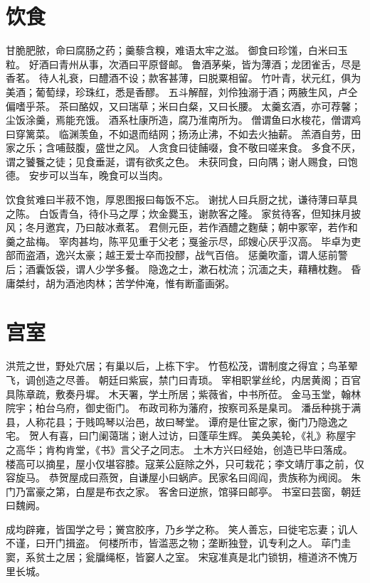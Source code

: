 \documentclass[12pt,UTF8]{ctexbook}
\begin{document}
\chapter{饮食}

甘脆肥脓，命曰腐肠之药；羹藜含糗，难语太牢之滋。
御食曰珍馐，白米曰玉粒。
好酒曰青州从事，次酒曰平原督邮。
鲁酒茅柴，皆为薄酒；龙团雀舌，尽是香茗。
待人礼衰，曰醴酒不设；款客甚薄，曰脱粟相留。
竹叶青，状元红，俱为美酒；葡萄绿，珍珠红，悉是香醪。
五斗解酲，刘伶独溺于酒；两腋生风，卢仝偏嗜乎茶。
茶曰酪奴，又曰瑞草；米曰白粲，又曰长腰。
太羹玄酒，亦可荐馨；尘饭涂羹，焉能充饿。
酒系杜康所造，腐乃淮南所为。
僧谓鱼曰水梭花，僧谓鸡曰穿篱菜。
临渊羡鱼，不如退而结网；扬汤止沸，不如去火抽薪。
羔酒自劳，田家之乐；含哺鼓腹，盛世之风。
人贪食曰徒餔啜，食不敬曰嗟来食。
多食不厌，谓之饕餮之徒；见食垂涎，谓有欲炙之色。
未获同食，曰向隅；谢人赐食，曰饱德。
安步可以当车，晚食可以当肉。

饮食贫难曰半菽不饱，厚恩图报曰每饭不忘。
谢扰人曰兵厨之扰，谦待薄曰草具之陈。
白饭青刍，待仆马之厚；炊金爨玉，谢款客之隆。
家贫待客，但知抹月披风；冬月邀宾，乃曰敲冰煮茗。
君侧元臣，若作酒醴之麴蘖；朝中冢宰，若作和羹之盐梅。
宰肉甚均，陈平见重于父老；戛釜示尽，邱嫂心厌乎汉高。
毕卓为吏部而盗酒，逸兴太豪；越王爱士卒而投醪，战气百倍。
惩羹吹齑，谓人惩前警后；酒囊饭袋，谓人少学多餐。
隐逸之士，漱石枕流；沉湎之夫，藉糟枕麴。
昏庸桀纣，胡为酒池肉林；苦学仲淹，惟有断齑画粥。

\chapter{宫室}

洪荒之世，野处穴居；有巢以后，上栋下宇。
竹苞松茂，谓制度之得宜；鸟革翚飞，调创造之尽善。
朝廷曰紫宸，禁门曰青琐。
宰相职掌丝纶，内居黄阁；百官具陈章疏，敷奏丹墀。
木天署，学土所居；紫薇省，中书所莅。
金马玉堂，翰林院宇；柏台乌府，御史衙门。
布政司称为藩府，按察司系是臬司。
潘岳种挑于满县，人称花县；于贱鸣琴以治邑，故曰琴堂。
谭府是仕宦之家，衡门乃隐逸之宅。
贺人有喜，曰门阑蔼瑞；谢人过访，曰蓬荜生辉。
美奂美轮，《礼》称屋宇之高华；肯构肯堂，《书》言父子之同志。
土木方兴曰经始，创造已毕曰落成。
楼高可以摘星，屋小仅堪容膝。寇莱公庭除之外，只可栽花；李文靖厅事之前，仅容旋马。
恭贺屋成曰燕贺，自谦屋小曰蜗庐。民家名曰闾阎，贵族称为阀阅。
朱门乃富豪之第，白屋是布衣之家。
客舍曰逆旅，馆驿曰邮亭。
书室曰芸窗，朝廷曰魏阙。

成均辟雍，皆国学之号；黉宫胶序，乃乡学之称。
笑人善忘，曰徙宅忘妻；讥人不谨，曰开门揖盗。
何楼所市，皆滥恶之物；垄断独登，讥专利之人。
荜门圭窦，系贫土之居；瓮牖绳枢，皆窭人之室。
宋寇准真是北门锁钥，檀道济不愧万里长城。
\end{document}
